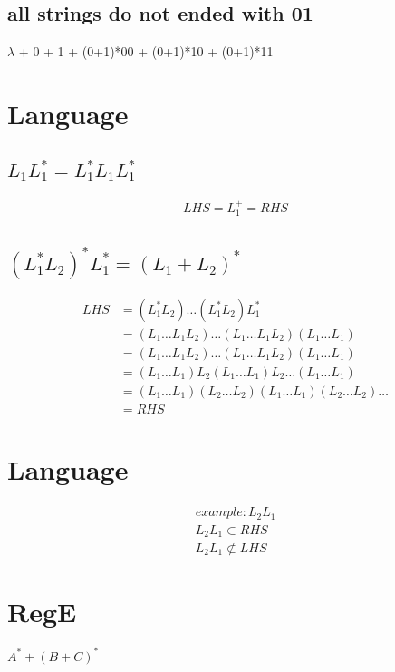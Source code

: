 \documentclass{article}
\begin{document}
\subsection{all strings do not ended with 01}
$\lambda$ + 0 + 1 + (0+1)*00 + (0+1)*10 + (0+1)*11

\section{Language}

\subsection{$L_1L_1^* = L_1^* L_1 L_1^*$}
\begin{align*}
LHS = L_1^+ = RHS
\end{align*}

\subsection{$(L_1^*L_2)^*L_1^* = (L_1 + L_2)^*$}
\begin{align*}
LHS
&= (L_1^*L_2) \dots (L_1^*L_2) L_1^*\\
&= (L_1 \dots L_1 L_2) \dots (L_1 \dots L_1 L_2) (L_1 \dots L_1)\\
&= (L_1 \dots L_1 L_2) \dots (L_1 \dots L_1 L_2) (L_1 \dots L_1)\\
&= (L_1 \dots L_1) L_2 (L_1 \dots L_1) L_2 \dots (L_1 \dots L_1)\\
&= (L_1 \dots L_1) (L_2 \dots L_2) (L_1 \dots L_1) (L_2 \dots L_2) \dots\\
&= RHS
\end{align*}

\section{Language}
\begin{align*}
example:L_2L_1\\
L_2L_1 \subset RHS\\
L_2L_1 \not\subset LHS
\end{align*}

\section{RegE}
$A^* + (B+C)^*$
\end{document}
